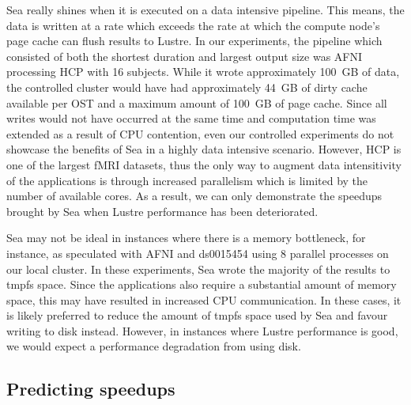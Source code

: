     Sea really shines when it is executed on a data intensive pipeline.
    This means, the data is written at a rate which exceeds the rate at
    which the compute node's page cache can flush results to Lustre. In
    our experiments, the pipeline which consisted of both the shortest
    duration and largest output size was AFNI processing HCP with 16 subjects.
    While it wrote approximately 100~GB of data, the controlled cluster would
    have had approximately 44~GB of dirty cache available per OST and a maximum
    amount of 100~GB of page cache. Since all writes would not have occurred at the same time
    and computation time was extended as a result of CPU contention, even our controlled experiments
    do not showcase the benefits of Sea in a highly data intensive scenario. However, HCP is one of the largest fMRI datasets, thus the only way to augment data intensitivity of the applications is through increased parallelism which is limited by the number of available cores. As a result, we can
    only demonstrate the speedups brought by Sea when Lustre performance has been deteriorated.


    Sea may not be ideal in instances where there is a memory bottleneck, for instance, as speculated
    with AFNI and ds0015454 using 8 parallel processes on our local cluster. In these experiments, Sea wrote the majority of the results to tmpfs space.
    Since the applications also require a substantial amount of memory space,
    this may have resulted in increased CPU communication. In these cases, it
    is likely preferred to reduce the amount of tmpfs space used by Sea and
    favour writing to disk instead. However, in instances where Lustre
    performance is good, we would expect a performance degradation from
    using disk.


    \subsection{Predicting speedups}

